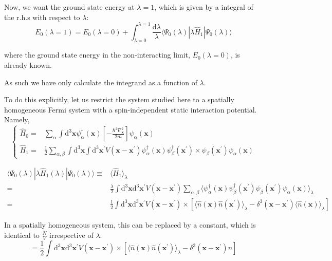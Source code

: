 Now, we want the ground state energy at $\lambda=1$, which is given by a integral of the r.h.s with respect to $\lambda$:
\begin{equation} \label{Eqs2.8.1}
E_0(\lambda=1) = E_0(\lambda=0) + \int_{\lambda=0}^{\lambda=1} \frac{\mathrm{d}\lambda}{\lambda}\langle \Psi_0(\lambda)|\lambda\hat{H}_1|\Psi_0(\lambda) \rangle
\end{equation}

where the ground state energy in the non-interacting limit, $E_0(\lambda=0)$, is already known.

As such we have only calculate the integrand as a function of $\lambda$.

To do this explicitly, let us restrict the system studied here to a spatially homogeneous Fermi system with a spin-independent static interaction potential. Namely,
\[ \left\{ \begin{split}
\hat{H}_0 =& \sum_{\alpha} \int \mathrm{d}^3 \mathbf{x} \psi_\alpha^\dagger(\mathbf{x})\left[ - \frac{\hbar^2\nabla_{\mathbf{x}}^2}{2m} \right] \psi_\alpha(\mathbf{x})\\
\hat{H}_1 =& \frac{1}{2}\sum_{\alpha,\beta} \int \mathrm{d}^3 \mathbf{x} \int \mathrm{d}^3 \mathbf{x}^{'} V(\mathbf{x}-\mathbf{x}^{'})\psi_\alpha^\dagger(\mathbf{x}) \psi_\beta^\dagger(\mathbf{x}^{'}) \times\psi_\beta(\mathbf{x}^{'})\psi_\alpha(\mathbf{x})
\end{split}\right. \]

\[ \begin{split}
\langle \Psi_0(\lambda)  | \lambda \hat{H}_1(\lambda) |  \Psi_0(\lambda)  \rangle \equiv& \langle\hat{H}_1\rangle_\lambda\\
=& \frac{\lambda}{2}\int \mathrm{d}^3 \mathbf{x} \mathrm{d}^3 \mathbf{x}^{'} V(\mathbf{x}-\mathbf{x}^{'})\sum_{\alpha,\beta}
\langle \psi_\alpha^\dagger(\mathbf{x}) \psi_\beta^\dagger(\mathbf{x}^{'}) \psi_\beta(\mathbf{x}^{'})\psi_\alpha(\mathbf{x}) \rangle_\lambda\\
=& \frac{1}{2}\int \mathrm{d}^3\mathbf{x}\mathrm{d}^3\mathbf{x}^{'}
V(\mathbf{x}-\mathbf{x}^{'}) \times
\left[ \langle \hat{n}(\mathbf{x}) \hat{n}(\mathbf{x}^{'}) \rangle_\lambda - \delta^3(\mathbf{x}-\mathbf{x}^{'})\langle \hat{n}(\mathbf{x}) \rangle_\lambda \right]
\end{split}\]

In a spatially homogeneous system, this can be replaced by a constant, which is identical to $\frac{N}{V}$ irrespective of $\lambda$.
\[ = \frac{1}{2}\int \mathrm{d}^3\mathbf{x}\mathrm{d}^3\mathbf{x}^{'}
V(\mathbf{x}-\mathbf{x}^{'}) \times
\left[ \langle \hat{n}(\mathbf{x}) \hat{n}(\mathbf{x}^{'}) \rangle_\lambda - \delta^3(\mathbf{x}-\mathbf{x}^{'}) n \right] \]

